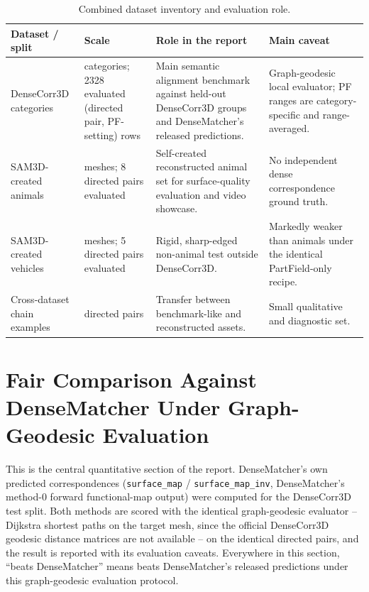 \documentclass{article}
\begin{document}
\begin{table}[H]
\centering
\small
\begin{tabularx}{\textwidth}{>{\raggedright\arraybackslash}p{}>{\raggedright\arraybackslash}p{}>{\raggedright\arraybackslash}p{}>{\raggedright\arraybackslash}X}
\toprule
Dataset / split & Scale & Role in the report & Main caveat \\
\midrule
DenseCorr3D categories & 23 categories; 2328 evaluated (directed pair, PF-setting) rows & Main semantic alignment benchmark against held-out DenseCorr3D groups and DenseMatcher's released predictions. & Graph-geodesic local evaluator; PF ranges are category-specific and range-averaged. \\
SAM3D-created animals & 14 meshes; 8 directed pairs evaluated & Self-created reconstructed animal set for surface-quality evaluation and video showcase. & No independent dense correspondence ground truth. \\
SAM3D-created vehicles & 25 meshes; 5 directed pairs evaluated & Rigid, sharp-edged non-animal test outside DenseCorr3D. & Markedly weaker than animals under the identical PartField-only recipe. \\
Cross-dataset chain examples & 2 directed pairs & Transfer between benchmark-like and reconstructed assets. & Small qualitative and diagnostic set. \\
\bottomrule
\end{tabularx}
\caption{Combined dataset inventory and evaluation role.}
\label{tab:datasets}
\end{table}

\section{Fair Comparison Against DenseMatcher Under Graph-Geodesic Evaluation}
\label{sec:densematcher-fair}

This is the central quantitative section of the report. DenseMatcher's own predicted
correspondences (\texttt{surface\_map} / \texttt{surface\_map\_inv}, DenseMatcher's method-0
forward functional-map output) were computed for the DenseCorr3D test split. Both
methods are scored with the identical graph-geodesic evaluator -- Dijkstra shortest paths on the
target mesh, since the official DenseCorr3D geodesic distance matrices are not available -- on the
identical directed pairs, and the result is reported with its evaluation caveats. Everywhere in
this section, ``beats DenseMatcher'' means beats DenseMatcher's released
predictions under this graph-geodesic evaluation protocol.
\end{document}
